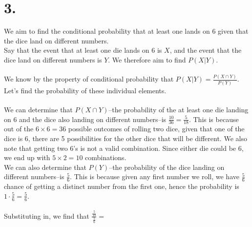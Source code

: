 \documentclass{article}
\begin{document}
\section*{3.}
{\Large 

We aim to find the conditional probability that at least one lands on 6 given that the dice land on different numbers. \\
Say that the event that at least one die lands on 6 is $X$, and the event that the dice land on different numbers is $Y$. We therefore aim to find $P(X|Y)$. \\ \\
We know by the property of conditional probability that $P(X|Y) = \frac{P(X \cap Y)}{P(Y)}$. Let's find the probability of these individual elements. \\ \\ 
We can determine that $P(X \cap Y)$--the probability of the at least one die landing on 6 and the dice also landing on different numbers--is $\frac{10}{36} = \frac{5}{18}$. This is because out of the $6 \times 6 = 36$ possible outcomes of rolling two dice, given that one of the dice is 6, there are 5 possibilities for the other dice that will be different. We also note that getting two 6's is not a valid combination. Since either die could be 6, we end up with $5 \times 2 = 10$ combinations. \\ 
We can also determine that $P(Y)$--the probability of the dice landing on different numbers--is $\frac{5}{6}$. This is because given any first number we roll, we have $\frac{5}{6}$ chance of getting a distinct number from the first one, hence the probability is $1 \cdot \frac{5}{6} = \frac{5}{6}$. \\ \\ 
Substituting in, we find that $\frac{\frac{5}{18}}{\frac{5}{6}} = $ 

}
\end{document}
